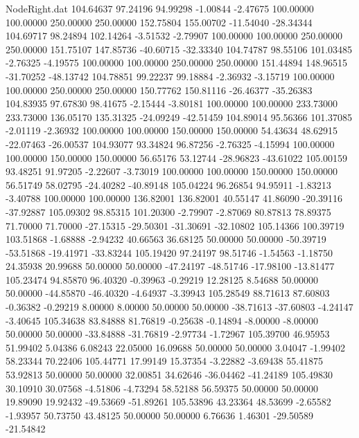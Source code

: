 \begin{filecontents}{NodeRight.dat}
 104.64637   97.24196   94.99298    -1.00844   -2.47675  100.00000  100.00000  250.00000  250.00000  152.75804  155.00702  -11.54040  -28.34344
 104.69717   98.24894  102.14264    -3.51532   -2.79907  100.00000  100.00000  250.00000  250.00000  151.75107  147.85736  -40.60715  -32.33340
 104.74787   98.55106  101.03485    -2.76325   -4.19575  100.00000  100.00000  250.00000  250.00000  151.44894  148.96515  -31.70252  -48.13742
 104.78851   99.22237   99.18884    -2.36932   -3.15719  100.00000  100.00000  250.00000  250.00000  150.77762  150.81116  -26.46377  -35.26383
 104.83935   97.67830   98.41675    -2.15444   -3.80181  100.00000  100.00000  233.73000  233.73000  136.05170  135.31325  -24.09249  -42.51459
 104.89014   95.56366  101.37085    -2.01119   -2.36932  100.00000  100.00000  150.00000  150.00000   54.43634   48.62915  -22.07463  -26.00537
 104.93077   93.34824   96.87256    -2.76325   -4.15994  100.00000  100.00000  150.00000  150.00000   56.65176   53.12744  -28.96823  -43.61022
 105.00159   93.48251   91.97205    -2.22607   -3.73019  100.00000  100.00000  150.00000  150.00000   56.51749   58.02795  -24.40282  -40.89148
 105.04224   96.26854   94.95911    -1.83213   -3.40788  100.00000  100.00000  136.82001  136.82001   40.55147   41.86090  -20.39116  -37.92887
 105.09302   98.85315  101.20300    -2.79907   -2.87069   80.87813   78.89375   71.70000   71.70000  -27.15315  -29.50301  -31.30691  -32.10802
 105.14366  100.39719  103.51868    -1.68888   -2.94232   40.66563   36.68125   50.00000   50.00000  -50.39719  -53.51868  -19.41971  -33.83244
 105.19420   97.24197   98.51746    -1.54563   -1.18750   24.35938   20.99688   50.00000   50.00000  -47.24197  -48.51746  -17.98100  -13.81477
 105.23474   94.85870   96.40320    -0.39963   -0.29219   12.28125    8.54688   50.00000   50.00000  -44.85870  -46.40320   -4.64937   -3.39943
 105.28549   88.71613   87.60803    -0.36382   -0.29219    8.00000    8.00000   50.00000   50.00000  -38.71613  -37.60803   -4.24147   -3.40645
 105.34638   83.84888   81.76819    -0.25638   -0.14894   -8.00000   -8.00000   50.00000   50.00000  -33.84888  -31.76819   -2.97734   -1.72967
 105.39700   46.95953   51.99402     5.04386    6.08243   22.05000   16.09688   50.00000   50.00000    3.04047   -1.99402   58.23344   70.22406
 105.44771   17.99149   15.37354    -3.22882   -3.69438   55.41875   53.92813   50.00000   50.00000   32.00851   34.62646  -36.04462  -41.24189
 105.49830   30.10910   30.07568    -4.51806   -4.73294   58.52188   56.59375   50.00000   50.00000   19.89090   19.92432  -49.53669  -51.89261
 105.53896   43.23364   48.53699    -2.65582   -1.93957   50.73750   43.48125   50.00000   50.00000    6.76636    1.46301  -29.50589  -21.54842

\end{filecontents}
